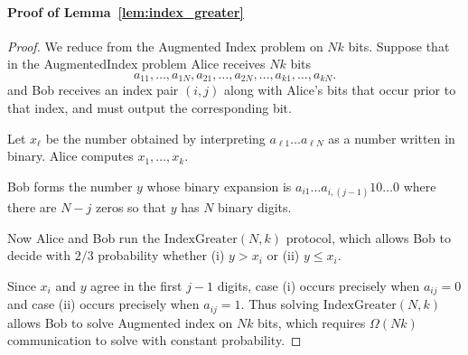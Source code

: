 \documentclass{article}
\theoremstyle{plain}
\begin{document}
\paragraph{Proof of Lemma~\ref{lem:index_greater}}
\begin{proof}
We reduce from the Augmented Index problem on $Nk$ bits.  Suppose that in the AugmentedIndex problem Alice receives $Nk$ bits \[
a_{11}, \ldots, a_{1N}, a_{21}, \ldots, a_{2N}, \ldots, a_{k1}, \ldots, a_{kN}.
\]
and  Bob receives an index pair $(i,j)$ along with Alice's bits that occur prior to that index, and must output the corresponding bit.

Let $x_{\ell}$ be the number obtained by interpreting $a_{\ell 1} \ldots a_{\ell N}$ as a number written in binary.  Alice computes $x_1, \ldots, x_k$.

Bob forms the number $y$ whose binary expansion is $a_{i1} \ldots a_{i, (j-1)} 1 0 \ldots 0$ where there are $N - j$ zeros so that $y$ has $N$ binary digits.



Now Alice and Bob run the $\text{IndexGreater}(N,k)$ protocol, which allows Bob to decide with $2/3$ probability whether (i) $y > x_{i}$ or (ii) $y \leq x_{i}.$

Since $x_i$ and $y$ agree in the first $j-1$ digits, case (i) occurs precisely when $a_{ij} = 0$ and case (ii) occurs precisely when $a_{ij} = 1.$  Thus solving $\text{IndexGreater}(N,k)$ allows Bob to solve Augmented index on $Nk$ bits, which requires $\Omega(Nk)$ communication to solve with constant probability.

\end{proof}
\end{document}
